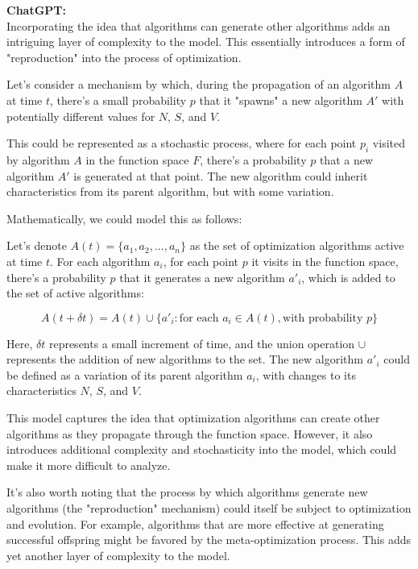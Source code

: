 \documentclass{article}[10pt]
\begin{document}
\noindent \textbf{ChatGPT:}\\
Incorporating the idea that algorithms can generate other algorithms adds an intriguing layer of complexity to the model. 
This essentially introduces a form of "reproduction" into the process of optimization.\par 

Let's consider a mechanism by which, during the propagation of an algorithm \( A \) at time \( t \), there's a small probability \( p \) that it "spawns" a new algorithm \( A' \) with potentially different values for \( N \), \( S \), and \( V \). \par

This could be represented as a stochastic process, where for each point \( p_i \) visited by algorithm \( A \) in the function space \( F \), there's a probability \( p \) that a new algorithm \( A' \) is generated at that point. 
The new algorithm could inherit characteristics from its parent algorithm, but with some variation. \par

Mathematically, we could model this as follows:\par

Let's denote \( A(t) = \{a_1, a_2, ..., a_n\} \) as the set of optimization algorithms active at time \( t \). 
For each algorithm \( a_i \), for each point \( p \) it visits in the function space, there's a probability \( p \) that it generates a new algorithm \( a'_i \), which is added to the set of active algorithms:

\[
A(t + \delta t) = A(t) \cup \{a'_i : \text{for each } a_i \in A(t), \text{with probability } p\}
\]

Here, \( \delta t \) represents a small increment of time, and the union operation \( \cup \) represents the addition of new algorithms to the set. 
The new algorithm \( a'_i \) could be defined as a variation of its parent algorithm \( a_i \), with changes to its characteristics \( N \), \( S \), and \( V \).\par

This model captures the idea that optimization algorithms can create other algorithms as they propagate through the function space. 
However, it also introduces additional complexity and stochasticity into the model, which could make it more difficult to analyze. \par

It's also worth noting that the process by which algorithms generate new algorithms (the "reproduction" mechanism) could itself be subject to optimization and evolution. 
For example, algorithms that are more effective at generating successful offspring might be favored by the meta-optimization process. 
This adds yet another layer of complexity to the model.\par
\end{document}
